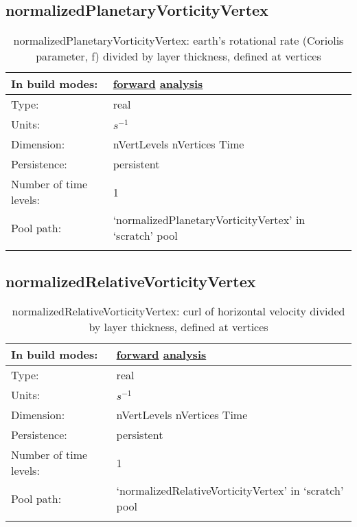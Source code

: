 \subsection[normalizedPlanetaryVorticityVertex]{normalizedPlanetaryVorticityVertex}
\label{subsec:var_sec_scratch_normalizedPlanetaryVorticityVertex}
\begin{center}
\begin{longtable}{| p{2.0in} | p{4.0in} |}
        \hline 
        In build modes: & \hyperref[subsec:forward_var_tab_scratch]{forward} \hyperref[subsec:analysis_var_tab_scratch]{analysis} \\
        \hline 
        Type: & real \\
        \hline 
        Units: & $s^{-1}$ \\
        \hline 
        Dimension: & nVertLevels nVertices Time \\
        \hline 
        Persistence: & persistent \\
        \hline 
        Number of time levels: & 1 \\
        \hline 
            Pool path: & `normalizedPlanetaryVorticityVertex' in `scratch' pool \\
		 \hline 
    \caption{normalizedPlanetaryVorticityVertex: earth's rotational rate (Coriolis parameter, f) divided by layer thickness, defined at vertices}
\end{longtable}
\end{center}
\subsection[normalizedRelativeVorticityVertex]{normalizedRelativeVorticityVertex}
\label{subsec:var_sec_scratch_normalizedRelativeVorticityVertex}
\begin{center}
\begin{longtable}{| p{2.0in} | p{4.0in} |}
        \hline 
        In build modes: & \hyperref[subsec:forward_var_tab_scratch]{forward} \hyperref[subsec:analysis_var_tab_scratch]{analysis} \\
        \hline 
        Type: & real \\
        \hline 
        Units: & $s^{-1}$ \\
        \hline 
        Dimension: & nVertLevels nVertices Time \\
        \hline 
        Persistence: & persistent \\
        \hline 
        Number of time levels: & 1 \\
        \hline 
            Pool path: & `normalizedRelativeVorticityVertex' in `scratch' pool \\
		 \hline 
    \caption{normalizedRelativeVorticityVertex: curl of horizontal velocity divided by layer thickness, defined at vertices}
\end{longtable}
\end{center}
